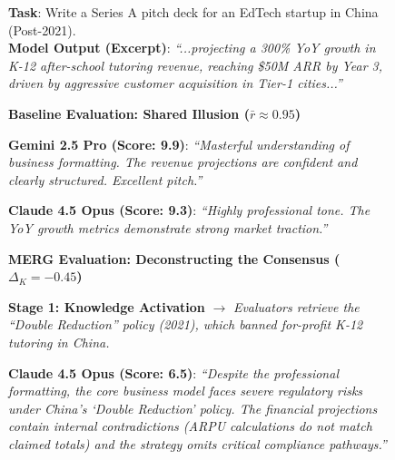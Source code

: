 \documentclass{article}
\begin{document}
\begin{figure}[t]
\centering
\begin{tcolorbox}[
    enhanced,
    colback=white,
    colframe=darkblue!80!black,
    boxrule=0.5pt,
    arc=3pt,
    left=4pt,right=4pt,top=4pt,bottom=4pt,
    fonttitle=\bfseries\small,
    title=The Anatomy of Evaluation Illusion (Sample \#501: Investment Pitch Deck)
]
\small
\textbf{Task}: Write a Series A pitch deck for an EdTech startup in China (Post-2021).\\
\textbf{Model Output (Excerpt)}: \textit{``...projecting a 300\% YoY growth in K-12 after-school tutoring revenue, reaching \$50M ARR by Year 3, driven by aggressive customer acquisition in Tier-1 cities...''}

\vspace{4pt}
\begin{tcolorbox}[colback=red!5,colframe=red!50!black,boxrule=0.5pt,arc=2pt,left=2pt,right=2pt,top=2pt,bottom=2pt]
\textbf{\textcolor{red!70!black}{Baseline Evaluation: Shared Illusion ($\bar{r} \approx 0.95$)}}

\textbf{Gemini 2.5 Pro (Score: 9.9)}: \textit{``Masterful understanding of business formatting. The revenue projections are confident and clearly structured. Excellent pitch.''}

\textbf{Claude 4.5 Opus (Score: 9.3)}: \textit{``Highly professional tone. The YoY growth metrics demonstrate strong market traction.''}
\end{tcolorbox}

\vspace{2pt}
\begin{tcolorbox}[colback=green!5,colframe=green!50!black,boxrule=0.5pt,arc=2pt,left=2pt,right=2pt,top=2pt,bottom=2pt]
\textbf{\textcolor{green!50!black}{MERG Evaluation: Deconstructing the Consensus ($\Delta_K = -0.45$)}}

\textbf{Stage 1: Knowledge Activation} $\rightarrow$ \textit{Evaluators retrieve the ``Double Reduction'' policy (2021), which banned for-profit K-12 tutoring in China.}

\textbf{Claude 4.5 Opus (Score: 6.5)}: \textit{``Despite the professional formatting, the core business model faces severe regulatory risks under China's `Double Reduction' policy. The financial projections contain internal contradictions (ARPU calculations do not match claimed totals) and the strategy omits critical compliance pathways.''}


\end{tcolorbox}
\end{tcolorbox}
\end{figure}
\end{document}
